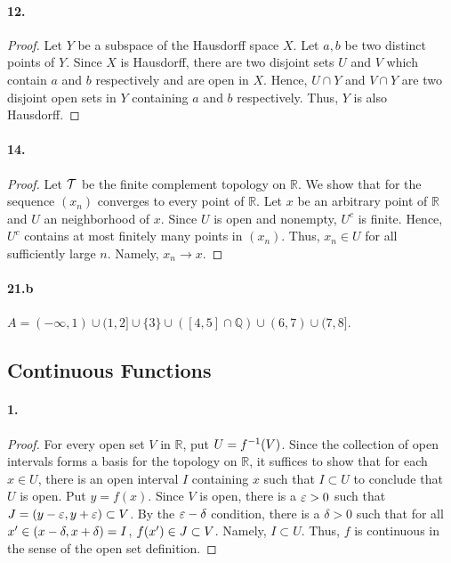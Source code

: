   \paragraph{12.}
  \begin{proof}
    Let $Y$ be a subspace of the Hausdorff space $X$. Let $a,b$ be two distinct
    points of $Y$. Since $X$ is Hausdorff, there are two disjoint sets $U$ and 
    $V$ which contain $a$ and $b$ respectively and are open in $X$. Hence, 
    $U\cap Y$ and $V\cap Y$ are two disjoint open sets in $Y$ containing $a$
    and $b$ respectively. Thus, $Y$ is also Hausdorff.
  \end{proof}
  
  \paragraph{14.}
  \begin{proof}
    Let $\mathcal{T}$ be the finite complement topology on $\mathbb{R}$. We show
    that for the sequence $(x_n)$ converges to every point of $\mathbb{R}$.
    Let $x$ be an arbitrary point of $\mathbb{R}$ and $U$ an neighborhood of 
    $x$. Since $U$ is open and nonempty, $U^c$ is finite. Hence, $U^c$ contains
    at most finitely many points in $(x_n)$. Thus, $x_n\in U$ for all 
    sufficiently large $n$. Namely, $x_n\to x$.
  \end{proof}
  
  \paragraph{21.b}
  \begin{solution}
    $A=(-\infty,1)\cup(1,2]\cup\{3\}\cup([4,5]\cap\mathbb{Q})\cup(6,7)\cup
    (7,8]$.
  \end{solution}
\subsection{Continuous Functions}
  \paragraph{1.}
  \begin{proof}
    For every open set $V$ in $\mathbb{R}$, put $U=f^{-1}(V)$. Since the 
    collection of open intervals forms a basis for the topology on 
    $\mathbb{R}$, it suffices to show that for each $x\in U$, there is an open
    interval $I$ containing $x$ such that $I\subset U$ to conclude that $U$ is
    open. Put $y=f(x)$. Since $V$ is open, there is a $\varepsilon>0$ such that $J=
    (y-\varepsilon,y+\varepsilon)\subset V$. By the $\varepsilon-\delta$ condition, there is a 
    $\delta>0$ such that for all $x^\prime\in(x-\delta,x+\delta)=I$, $f(x^\prime)\in
    J\subset V$. Namely, $I\subset U$. Thus, $f$ is continuous in the sense of
    the open set definition.
  \end{proof}
  
